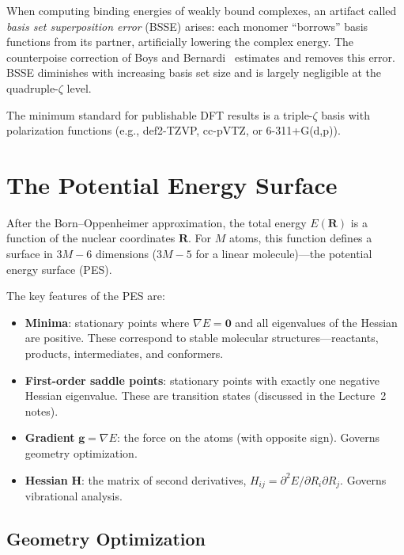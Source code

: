 \documentclass[11pt]{article}
\numberwithin{equation}{section}
\begin{document}
When computing binding energies of weakly bound complexes, an artifact called \emph{basis set superposition error} (BSSE) arises: each monomer ``borrows'' basis functions from its partner, artificially lowering the complex energy. The counterpoise correction of Boys and Bernardi~\cite{BoysBernardi1970} estimates and removes this error. BSSE diminishes with increasing basis set size and is largely negligible at the quadruple-$\zeta$ level.

The minimum standard for publishable DFT results is a triple-$\zeta$ basis with polarization functions (e.g., def2-TZVP, cc-pVTZ, or 6-311+G(d,p)).


\section{The Potential Energy Surface}
\label{sec:PES}

After the Born--Oppenheimer approximation, the total energy $E(\mathbf{R})$ is a function of the nuclear coordinates $\mathbf{R}$. For $M$ atoms, this function defines a surface in $3M-6$ dimensions ($3M-5$ for a linear molecule)---the potential energy surface (PES).

The key features of the PES are:
\begin{itemize}
\item \textbf{Minima}: stationary points where $\nabla E = \mathbf{0}$ and all eigenvalues of the Hessian are positive. These correspond to stable molecular structures---reactants, products, intermediates, and conformers.
\item \textbf{First-order saddle points}: stationary points with exactly one negative Hessian eigenvalue. These are transition states (discussed in the Lecture~2 notes).
\item \textbf{Gradient} $\mathbf{g} = \nabla E$: the force on the atoms (with opposite sign). Governs geometry optimization.
\item \textbf{Hessian} $\mathbf{H}$: the matrix of second derivatives, $H_{ij} = \partial^2 E/\partial R_i\partial R_j$. Governs vibrational analysis.
\end{itemize}

\subsection{Geometry Optimization}
\end{document}
